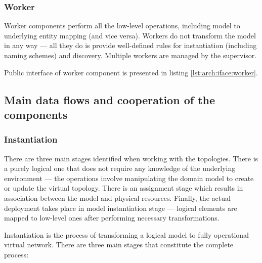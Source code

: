 \documentclass[11pt]{book}
\begin{document}
        \subsubsection{Worker}

          Worker components perform all the low-level operations, including model to underlying entity mapping (and vice
          versa). Workers do not transform the model in any way --- all they do is provide well-defined rules for
          instantiation (including naming schemes) and discovery. Multiple workers are managed by the supervisor.

          Public interface of worker component is presented in listing \ref{lst:arch:iface:worker}. \\

          \noindent
          \begin{minipage}{\textwidth}
            
          \end{minipage}


      \subsection{Main data flows and cooperation of the components}

        \subsubsection{Instantiation}

          There are three main stages identified when working with the topologies. There is a purely logical one that
          does not require any knowledge of the underlying environment --- the operations involve manipulating the
          domain model to create or update the virtual topology. There is an assignment stage which results in
          association between the model and physical resources. Finally, the actual deployment takes place in model
          instantiation stage --- logical elements are mapped to low-level ones after performing necessary
          transformations.

          Instantiation is the process of transforming a logical model to fully operational virtual network. There are
          three main stages that constitute the complete process:
\end{document}
